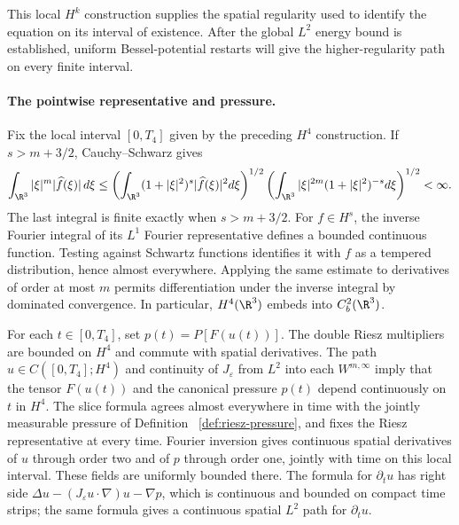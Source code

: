 \documentclass[11pt,reqno]{amsart}
\begin{document}
This local $H^k$ construction supplies the spatial regularity used to
identify the equation on its interval of existence. After the global $L^2$
energy bound is established, uniform Bessel-potential restarts will give the
higher-regularity path on every finite interval.

\paragraph{The pointwise representative and pressure.}
Fix the local interval $[0,T_4]$ given by the preceding $H^4$ construction.
If $s>m+3/2$, Cauchy--Schwarz gives
\begin{equation}\label{eq:reg-fourier-l1}
  \int_{\R^3}|\xi|^m|\widehat f(\xi)|\,d\xi
  \le\left(\int_{\R^3}(1+|\xi|^2)^s|\widehat f(\xi)|^2d\xi\right)^{1/2}
     \left(\int_{\R^3}|\xi|^{2m}(1+|\xi|^2)^{-s}d\xi\right)^{1/2}<\infty.
\end{equation}
The last integral is finite exactly when $s>m+3/2$. For $f\in H^s$, the
inverse Fourier integral of its $L^1$ Fourier representative defines a bounded
continuous function. Testing against Schwartz functions identifies it with
$f$ as a tempered distribution, hence almost everywhere. Applying the same
estimate to derivatives of order at most $m$ permits differentiation under
the inverse integral by dominated convergence. In particular, $H^4(\R^3)$
embeds into $C_b^2(\R^3)$.

For each $t\in[0,T_4]$, set $p(t)=P[F(u(t))]$. The double Riesz multipliers
are bounded on $H^4$ and commute with spatial derivatives. The path $u\in C([0,T_4];H^4)$ and continuity of $J_\varepsilon$ from $L^2$
into each $W^{m,\infty}$ imply that the tensor $F(u(t))$ and the canonical
pressure $p(t)$ depend continuously on $t$ in $H^4$. The slice formula agrees almost everywhere in
time with the jointly measurable pressure of Definition~
\ref{def:riesz-pressure}, and fixes the Riesz representative at every time.
Fourier inversion gives continuous spatial derivatives of $u$ through order
two and of $p$ through order one, jointly with time on this local interval.
These fields are uniformly bounded there. The formula for $\partial_tu$ has right side
$\Delta u-(J_\varepsilon u\cdot\nabla)u-\nabla p$, which is continuous
and bounded on compact time strips; the same formula gives a
continuous spatial $L^2$ path for $\partial_tu$.
\end{document}
